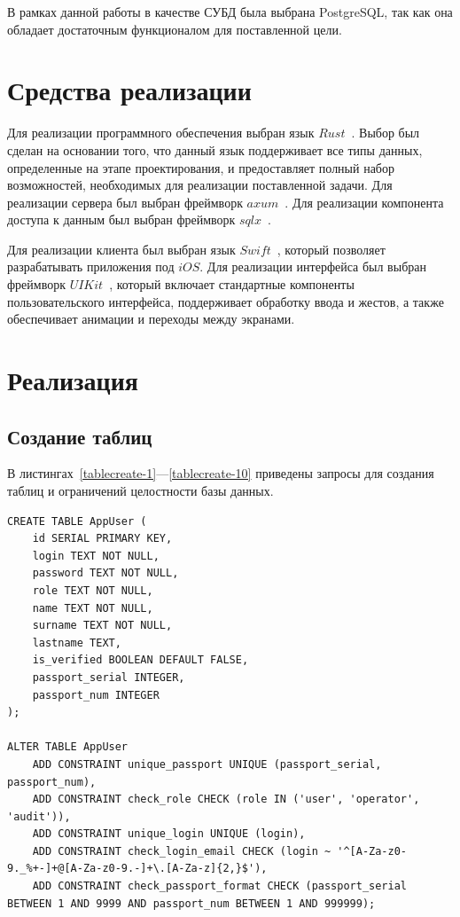 В рамках данной работы в качестве СУБД была выбрана PostgreSQL, так как она обладает достаточным функционалом для поставленной цели.

\section{Средства реализации}

Для реализации программного обеспечения выбран язык $Rust$~\cite{rust-book}. Выбор был сделан на основании того, что данный язык поддерживает все типы данных, определенные на этапе проектирования, и предоставляет полный набор возможностей, необходимых для реализации поставленной задачи. Для реализации сервера был выбран фреймворк $axum$~\cite{axum-crate}. Для реализации компонента доступа к данным был выбран фреймворк $sqlx$~\cite{sqlx-crate}.

Для реализации клиента был выбран язык $Swift$~\cite{swift-lang}, который позволяет разрабатывать приложения под $iOS$. Для реализации интерфейса был выбран фреймворк $UIKit$~\cite{uikit-fw}, который включает стандартные компоненты пользовательского интерфейса, поддерживает обработку ввода и жестов, а также обеспечивает анимации и переходы между экранами.


\section{Реализация}

\subsection{Создание таблиц}

В листингах~\ref{tablecreate-1}---\ref{tablecreate-10} приведены запросы для создания таблиц и ограничений целостности базы данных.

\begin{center}
\captionsetup{justification=raggedright,singlelinecheck=off}
\begin{lstlisting}[label=tablecreate-1, caption=Создание таблицы AppUser]
CREATE TABLE AppUser (
    id SERIAL PRIMARY KEY,
    login TEXT NOT NULL,
    password TEXT NOT NULL,
    role TEXT NOT NULL,
    name TEXT NOT NULL,
    surname TEXT NOT NULL,
    lastname TEXT,
    is_verified BOOLEAN DEFAULT FALSE,
    passport_serial INTEGER,
    passport_num INTEGER
);

ALTER TABLE AppUser
    ADD CONSTRAINT unique_passport UNIQUE (passport_serial, passport_num),
    ADD CONSTRAINT check_role CHECK (role IN ('user', 'operator', 'audit')),
    ADD CONSTRAINT unique_login UNIQUE (login),
    ADD CONSTRAINT check_login_email CHECK (login ~ '^[A-Za-z0-9._%+-]+@[A-Za-z0-9.-]+\.[A-Za-z]{2,}$'),
    ADD CONSTRAINT check_passport_format CHECK (passport_serial BETWEEN 1 AND 9999 AND passport_num BETWEEN 1 AND 999999);
\end{lstlisting}
\end{center}

